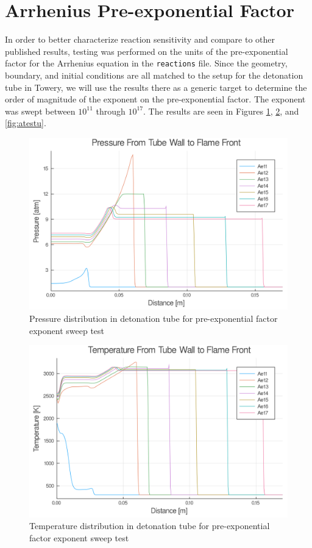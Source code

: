\section{Arrhenius Pre-exponential Factor}
\label{sec:a}

In order to better characterize reaction sensitivity and compare to other published results, testing was performed on the units of the pre-exponential factor for the Arrhenius equation in the \verb|reactions| file. Since the geometry, boundary, and initial conditions are all matched to the setup for the detonation tube in Towery\cite{towery1}, we will use the results there as a generic target to determine the order of magnitude of the exponent on the pre-exponential factor. The exponent was swept between \(10^{11}\) through \(10^{17}\). The results are seen in Figures \ref{fig:atestp}, \ref{fig:atestt}, and \ref{fig:atestu}. 

\begin{figure}
\centering
\includegraphics[width=0.85\linewidth]{./figs/Atest/p.png}
\caption{Pressure distribution in detonation tube for pre-exponential factor exponent sweep test}
\label{fig:atestp}
\end{figure}

\begin{figure}
\centering
\includegraphics[width=0.85\linewidth]{./figs/Atest/t.png}
\caption{Temperature distribution in detonation tube for pre-exponential factor exponent sweep test}
\label{fig:atestt}
\end{figure}

